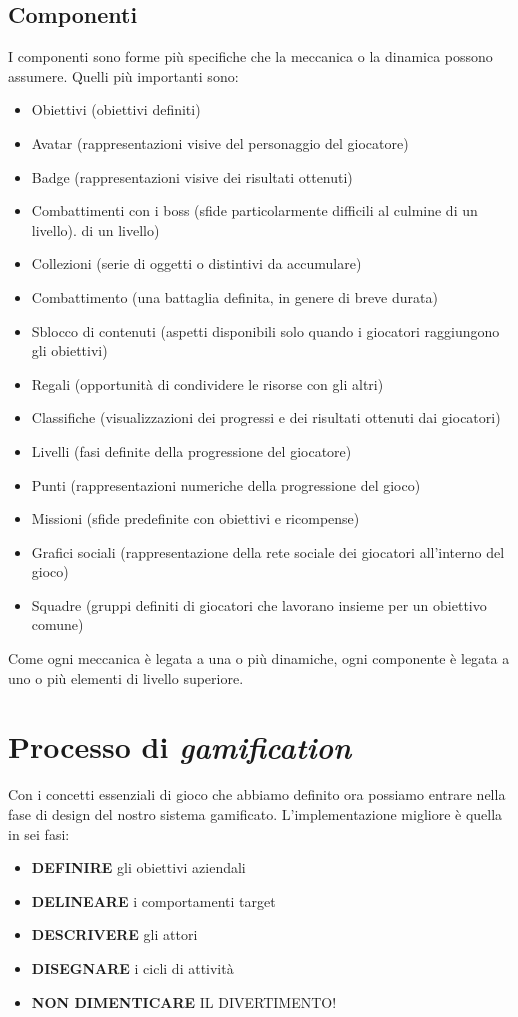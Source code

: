 \begin{itemize}
\subsection{Componenti}
I componenti sono forme più specifiche che la meccanica o la dinamica possono assumere.
Quelli più importanti sono:
\begin{itemize}
\item Obiettivi (obiettivi definiti)
\item Avatar (rappresentazioni visive del personaggio del giocatore)
\item Badge (rappresentazioni visive dei risultati ottenuti)
\item Combattimenti con i boss (sfide particolarmente difficili al culmine di un livello).
di un livello)
\item Collezioni (serie di oggetti o distintivi da accumulare)
\item Combattimento (una battaglia definita, in genere di breve durata)
\item Sblocco di contenuti (aspetti disponibili solo quando i giocatori raggiungono gli obiettivi)
\item Regali (opportunità di condividere le risorse con gli altri)
\item Classifiche (visualizzazioni dei progressi e dei risultati ottenuti dai giocatori)
\item Livelli (fasi definite della progressione del giocatore)
\item Punti (rappresentazioni numeriche della progressione del gioco)
\item Missioni (sfide predefinite con obiettivi e ricompense)
\item Grafici sociali (rappresentazione della rete sociale dei giocatori all'interno del gioco)
\item Squadre (gruppi definiti di giocatori che lavorano insieme per un obiettivo comune)
\end{itemize}
Come ogni meccanica è legata a una o più dinamiche, ogni componente è legata a uno o più elementi di livello superiore.

\section{Processo di \textit{gamification}}

Con i concetti essenziali di gioco che abbiamo definito ora possiamo entrare nella fase di design del nostro sistema gamificato.
L'implementazione migliore è quella in sei fasi:
\begin{itemize}
\item \textbf{DEFINIRE} gli obiettivi aziendali
\item \textbf{DELINEARE} i comportamenti target
\item \textbf{DESCRIVERE} gli attori
\item \textbf{DISEGNARE} i cicli di attività
\item \textbf{NON DIMENTICARE} IL DIVERTIMENTO!
\end{itemize}

\end{itemize}
